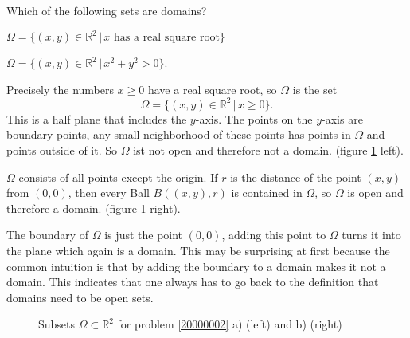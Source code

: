Which of the following sets are domains?
\begin{teilaufgaben}
\item $\Omega=\{(x,y)\in\mathbb R^2\,|\, \text{$x$ has a real square root}\}$
\item $\Omega=\{(x,y)\in\mathbb R^2\,|\, x^2+y^2>0\}$.
\end{teilaufgaben}


\begin{loesung}
\begin{teilaufgaben}
\item
Precisely the numbers
$x\ge 0$ have a real square root, so $\Omega$ is the set
\[
\Omega=\{(x,y)\in\mathbb R^2\,|\, x\ge 0\}.
\]
This is a half plane that includes the $y$-axis.
The points on the $y$-axis are boundary points, any small neighborhood of
these points has points in $\Omega$ and points outside of it.
So $\Omega$ ist not open and therefore not a domain.
(figure \ref{20000002:fig} left).
\item
$\Omega$ consists of all points except the origin.
If $r$ is the distance of the point $(x,y)$ from $(0,0)$, then every
Ball
$B((x,y),r)$ is contained in $\Omega$, so $\Omega$ is open and therefore
a domain.
(figure \ref{20000002:fig} right).

The boundary of $\Omega$ is just the point $(0,0)$, adding this point
to $\Omega$ turns it into the plane which again is a domain.
This may be surprising at first because the common intuition is that
by adding the boundary to a domain makes it not a domain.
This indicates that one always has to go back to the definition
that domains need to be open sets.
\qedhere
\end{teilaufgaben}
\begin{figure}
\begin{center}
\end{center}
\caption{Subsets $\Omega\subset\mathbb R^2$ for problem \ref{20000002} a)
(left) 
and b) (right)\label{20000002:fig}}
\end{figure}
\end{loesung}
